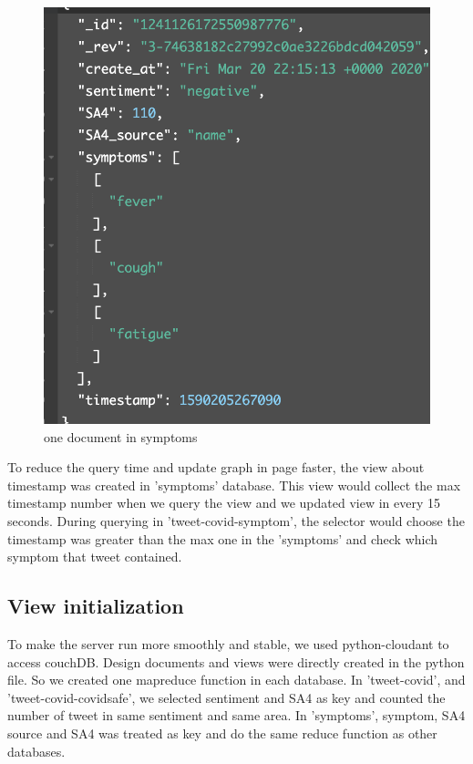 \begin{figure}[H]
    \centering
    \includegraphics[scale=0.4]{city_analytics/report/images/symptomsdb.png}
    \caption{one document in symptoms}
    \label{fig:my_label}
\end{figure}

To reduce the query time and update graph in page faster, the view about timestamp was created in 'symptoms' database. This view would collect the max timestamp number when we query the view and we updated view in every 15 seconds. During querying in 'tweet-covid-symptom', the selector would choose the timestamp was greater than the max one in the 'symptoms' and check which symptom that tweet contained. 

\subsection{View initialization}

To make the server run more smoothly and stable, we used python-cloudant to access couchDB. Design documents and views were directly created in the python file. So we created one mapreduce function in each database. In 'tweet-covid', and 'tweet-covid-covidsafe', we selected sentiment and SA4 as key and counted the number of tweet in same sentiment and same area. In 'symptoms', symptom, SA4 source and SA4 was treated as key and do the same reduce function as other databases. 

